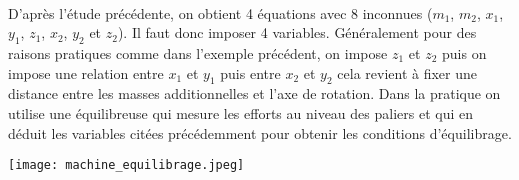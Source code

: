 \begin{prop}~\\

\begin{minipage}[c]{.8\linewidth}
D'après l'étude précédente, on obtient 4 équations avec 8 inconnues ($m_1$, $m_2$, $x_1$, $y_1$, $z_1$, $x_2$, $y_2$ et $z_2$).
Il faut donc imposer 4 variables. Généralement pour des raisons pratiques comme dans l'exemple précédent, on impose $z_1$ et $z_2$ puis on impose une relation entre $x_1$ et $y_1$ puis entre $x_2$ et $y_2$ cela revient à fixer une distance entre les masses additionnelles et l'axe de rotation.
Dans la pratique on utilise une équilibreuse qui mesure les efforts au niveau des paliers et qui en déduit les variables citées précédemment pour obtenir les conditions d'équilibrage.

\end{minipage}\hfill
\begin{minipage}[c]{.15\linewidth}
\begin{center}
\texttt{[image: machine\_equilibrage.jpeg]}
\end{center}
\end{minipage}
\end{prop}






